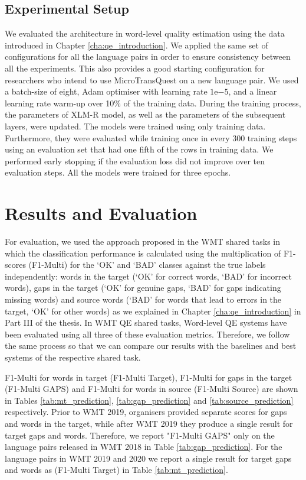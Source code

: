 \subsection{Experimental Setup}
\label{sec:word_level_experiment}
We evaluated the architecture in word-level quality estimation using the data introduced in Chapter \ref{cha:qe_introduction}. We applied the same set of configurations for all the language pairs in order to ensure consistency between all the experiments. This also provides a good starting configuration for researchers who intend to use MicroTransQuest on a new language pair. We used a batch-size of eight, Adam optimiser with learning rate $1\mathrm{e}{-5}$, and a linear learning rate warm-up over 10\% of the training data. During the training process, the parameters of XLM-R model, as well as the parameters of the subsequent layers, were updated. The models were trained using only training data. Furthermore, they were evaluated while training once in every 300 training steps using an evaluation set that had one fifth of the rows in training data. We performed early stopping if the evaluation loss did not improve over ten evaluation steps. All the models were trained for three epochs.

\section{Results and Evaluation}
\label{sec:word_level_results}
For evaluation, we used the approach proposed in the WMT shared tasks in which the classification performance is calculated using the multiplication of F1-scores (F1-Multi) for the `OK' and `BAD' classes against the true labels
independently: words in the target (`OK' for correct words, `BAD' for incorrect words), gaps in the target (`OK' for genuine gaps, `BAD' for gaps indicating missing words) and source words (`BAD' for words that lead to errors in the target, `OK' for other words) \autocite{specia-etal-2018-findings} as we explained in Chapter \ref{cha:qe_introduction} in Part III of the thesis. In WMT QE shared tasks, Word-level QE systems have been evaluated using all three of these evaluation metrics. Therefore, we follow the same process so that we can compare our results with the baselines and best systems of the respective shared task.

F1-Multi for words in target (F1-Multi Target), F1-Multi for gaps in the target (F1-Multi GAPS) and F1-Multi for words in source (F1-Multi Source) are shown in Tables \ref{tab:mt_prediction}, \ref{tab:gap_prediction} and \ref{tab:source_prediction} respectively. Prior to WMT 2019, organisers provided separate scores for gaps and words in the target, while after WMT 2019 they produce a single result for target gaps and words. Therefore, we report "F1-Multi GAPS" only on the language pairs released in WMT 2018 in Table \ref{tab:gap_prediction}. For the language pairs in WMT 2019 and 2020 we report a single result for target gaps and words as (F1-Multi Target) in Table \ref{tab:mt_prediction}.

